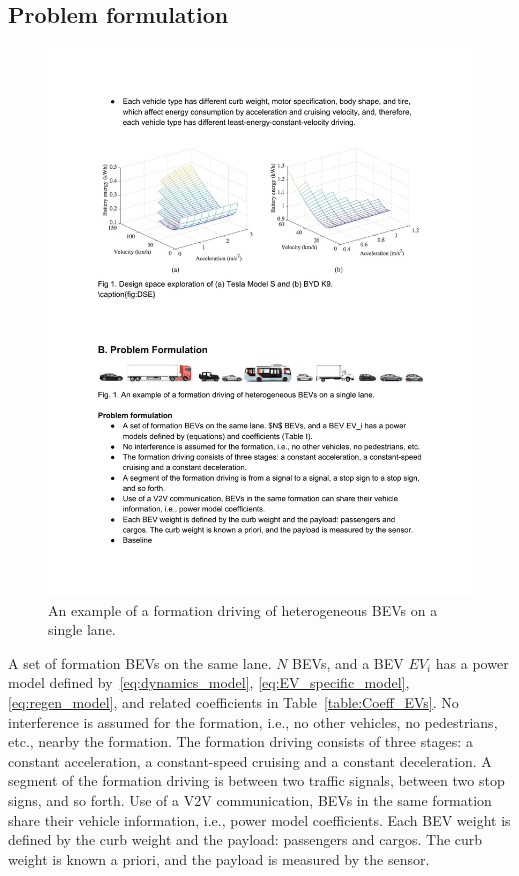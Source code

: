 \documentclass{IEEEtran}
\begin{document}
\subsection{Problem formulation} \label{subsec:problem}

\begin{figure}	%
\centering
\includegraphics[width=1.0\hsize]{Figures/Example.pdf}
\caption{An example of a formation driving of heterogeneous BEVs on a single lane.}
\label{fig:example}
\end{figure} 

A set of formation BEVs on the same lane. $N$ BEVs, and a BEV $EV_i$ has a power model defined by~\eqref{eq:dynamics_model}, \eqref{eq:EV_specific_model}, \eqref{eq:regen_model}, and related coefficients in Table~\ref{table:Coeff_EVs}.
No interference is assumed for the formation, i.e., no other vehicles, no pedestrians, etc., nearby the formation.
The formation driving consists of three stages: a constant acceleration, a constant-speed cruising and a constant deceleration.
A segment of the formation driving is between two traffic signals, between two stop signs, and so forth.
Use of a V2V communication, BEVs in the same formation share their vehicle information, i.e., power model coefficients.
Each BEV weight is defined by the curb weight and the payload: passengers and cargos. The curb weight is known a priori, and the payload is measured by the sensor. 
\end{document}
